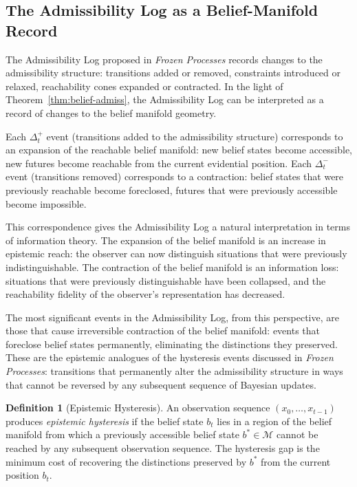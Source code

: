 \documentclass[12pt, a4paper]{article}
\theoremstyle{plain}
\theoremstyle{definition}
\newtheorem{definition}[theorem]{Definition}
\theoremstyle{remark}
\begin{document}
\subsection{The Admissibility Log as a Belief-Manifold Record}

The Admissibility Log proposed in \emph{Frozen Processes} records
changes to the admissibility structure: transitions added or removed,
constraints introduced or relaxed, reachability cones expanded or
contracted. In the light of Theorem~\ref{thm:belief-admiss}, the
Admissibility Log can be interpreted as a record of changes to the
belief manifold geometry.

Each $\Delta_t^+$ event (transitions added to the admissibility structure)
corresponds to an expansion of the reachable belief manifold: new belief
states become accessible, new futures become reachable from the current
evidential position. Each $\Delta_t^-$ event (transitions removed)
corresponds to a contraction: belief states that were previously reachable
become foreclosed, futures that were previously accessible become impossible.

This correspondence gives the Admissibility Log a natural interpretation
in terms of information theory. The expansion of the belief manifold is
an increase in epistemic reach: the observer can now distinguish situations
that were previously indistinguishable. The contraction of the belief
manifold is an information loss: situations that were previously
distinguishable have been collapsed, and the reachability fidelity of
the observer's representation has decreased.

The most significant events in the Admissibility Log, from this perspective,
are those that cause irreversible contraction of the belief manifold:
events that foreclose belief states permanently, eliminating the distinctions
they preserved. These are the epistemic analogues of the hysteresis events
discussed in \emph{Frozen Processes}: transitions that permanently alter
the admissibility structure in ways that cannot be reversed by any subsequent
sequence of Bayesian updates.

\begin{definition}[Epistemic Hysteresis]
An observation sequence $(x_0, \ldots, x_{t-1})$ produces
\emph{epistemic hysteresis} if the belief state $b_t$ lies in a region
of the belief manifold from which a previously accessible belief state
$b^* \in \mathcal{M}$ cannot be reached by any subsequent observation
sequence. The hysteresis gap is the minimum cost of recovering the
distinctions preserved by $b^*$ from the current position $b_t$.
\end{definition}
\end{document}
